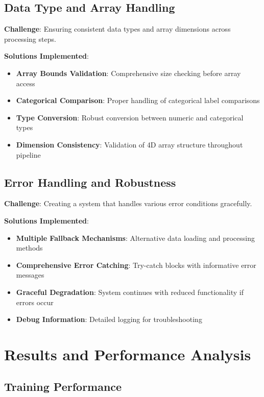 \documentclass[12pt,a4paper]{article}
\begin{document}
\subsection{Data Type and Array Handling}

\textbf{Challenge}: Ensuring consistent data types and array dimensions across processing steps.

\textbf{Solutions Implemented}:
\begin{itemize}
    \item \textbf{Array Bounds Validation}: Comprehensive size checking before array access
    \item \textbf{Categorical Comparison}: Proper handling of categorical label comparisons
    \item \textbf{Type Conversion}: Robust conversion between numeric and categorical types
    \item \textbf{Dimension Consistency}: Validation of 4D array structure throughout pipeline
\end{itemize}

\subsection{Error Handling and Robustness}

\textbf{Challenge}: Creating a system that handles various error conditions gracefully.

\textbf{Solutions Implemented}:
\begin{itemize}
    \item \textbf{Multiple Fallback Mechanisms}: Alternative data loading and processing methods
    \item \textbf{Comprehensive Error Catching}: Try-catch blocks with informative error messages
    \item \textbf{Graceful Degradation}: System continues with reduced functionality if errors occur
    \item \textbf{Debug Information}: Detailed logging for troubleshooting
\end{itemize}

\section{Results and Performance Analysis}

\subsection{Training Performance}
\end{document}
